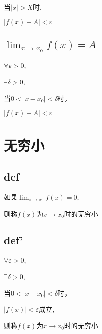 \documentclass{article}
\begin{document}
    当$\left| x \right| > X$时, 

    $\left|f(x)-A\right| <\varepsilon$ 

    \subsection{$ \lim_{x \to x_0} f(x) = A $}

    $\forall \varepsilon > 0$, 

    $\exists \delta > 0$, 

    当$0 < \left| x - x_0 \right| < \delta$时，

    $\left|f(x) - A \right| < \varepsilon$

    \section{无穷小}

    \subsection{def}

    如果$\lim_{x \to x_0} f(x) =0$, 

    则称$f(x)$为$x \rightarrow x_0$时的无穷小

    \subsection{def'}

    $ \forall \varepsilon > 0 $, 
    
    $ \exists \delta > 0 $, 

    当$0 < \left| x - x_0 \right| < \delta$时，

    $\left| f(x) \right| < \varepsilon$成立,

    则称$f(x)$为$x \rightarrow x_0$时的无穷小
\end{document}
